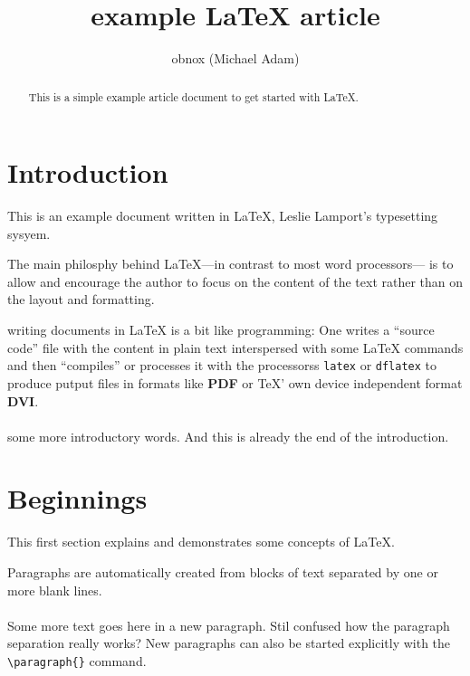 \documentclass{article}
\title{example {\LaTeX} article}
\author{obnox (Michael Adam)}
\begin{document}
\maketitle
\begin{abstract}

    This is a simple  example article document to get started with  {\LaTeX}.

\end{abstract}

\tableofcontents

\section*{Introduction}

This is an example document written in {\LaTeX}, Leslie Lamport's typesetting
sysyem.

The main philosphy behind {\LaTeX}---in contrast to most word processors--- is to allow and encourage the author to
focus on the content of the text rather than on the layout and formatting.

writing documents in {\LaTeX} is a bit like programming: One writes a ``source code'' file with the content in plain text
interspersed with some {\LaTeX} commands
and then ``compiles'' or processes it with the processorss \verb|latex| or \verb|dflatex| to produce
putput files in formats like \textbf{PDF} or {TeX}' own device independent format \textbf{DVI}.


\paragraph{}some more introductory words.
And this is already the end of the introduction.




\section{Beginnings}
\label{sec:beginnings}

This first section explains and demonstrates some concepts of {\LaTeX}.

Paragraphs are automatically created from blocks of text separated by one or more
blank lines.


\paragraph{} Some more text goes here in a new paragraph.
Stil confused how the paragraph separation really works?
New paragraphs can also be started explicitly with the \verb|\paragraph{}| command.
\end{document}
